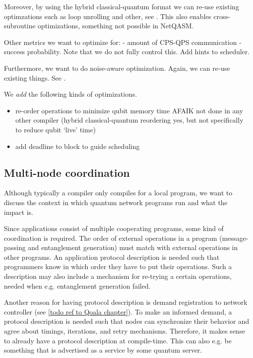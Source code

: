 Moreover, by using the hybrid classical-quantum format we can re-use existing optimzations such as loop unrolling and other, see .
This also enables cross-subroutine optimizations, something not possible in NetQASM.

Other metrics we want to optimize for:
- amount of CPS-QPS communication
- success probability. Note that we do not fully control this. Add hints to scheduler.

Furthermore, we want to do noise-aware optimization.
Again, we can re-use existing things. See \cite{smith_error_2021, murali_noise-adaptive_2019}.

We \textit{add} the following kinds of optimizations.
\begin{itemize}
  \item re-order operations to minimize qubit memory time
    AFAIK not done in any other compiler (hybrid classical-quantum reordering yes, but not specifically to reduce qubit `live' time)
  \item add deadline to block to guide scheduling
\end{itemize}




\subsection{Multi-node coordination}
Although typically a compiler only compiles for a local program, we want to discuss the context in which quantum network programs run and what the impact is.

Since applications consist of multiple cooperating programs, some kind of coordination is required.
The order of external operations in a program (message-passing and entanglement generation) must match with external operations in other programs.
An application protocol description is needed such that programmers know in which order they have to put their operations.
Such a description may also include a mechanism for re-trying a certain operations, needed when e.g. entanglement generation failed.

Another reason for having protocol description is demand registration to network controller (see \ref{todo ref to Qoala chapter}). To make an informed demand, a protocol description is needed such that nodes can synchronize their behavior and agree about timings, iterations, and retry mechanisms. Therefore, it makes sense to already have a protocol description at compile-time. This can also e.g. be something that is advertised as a service by some quantum server.

